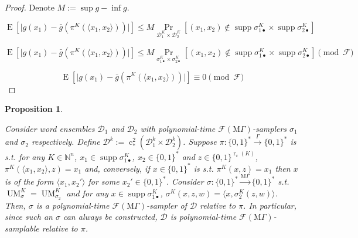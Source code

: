 \documentclass[11pt]{article}
\numberwithin{equation}{section}
\theoremstyle{definition}
\theoremstyle{plain}
\newtheorem{proposition}{Proposition}[section]
\newcommand{\Bool}{\{0,1\}}
\newcommand{\Words}{{\Bool^*}}
\DeclareMathOperator{\Supp}{supp}
\DeclareMathOperator{\Prb}{Pr}
\DeclareMathOperator{\E}{E}
\DeclareMathOperator{\R}{r}
\DeclareMathOperator{\UM}{UM}
\DeclareMathOperator{\En}{c}
\newcommand{\Nats}{\mathbb{N}}
\newcommand{\Abs}[1]{\lvert #1 \rvert}
\newcommand{\Chev}[1]{\langle #1 \rangle}
\newcommand{\Dist}{\mathcal{D}}
\newcommand{\MGrow}{\mathrm{M}\Gamma}
\newcommand{\Fall}{\mathcal{F}}
\newcommand{\EMG}{\Fall(\MGrow)}
\newcommand{\Scheme}{\xrightarrow{\Gamma}}
\newcommand{\MScheme}{\xrightarrow{\MGrow}}
\begin{document}
\begin{proof}

Denote $M:= \sup g - \inf g$.

$$\E[\Abs{g(x_1)-\bar{g}(\pi^{K}(\Chev{x_1,x_2}))}] \leq M \Prb_{ \Dist_1^{K} \times \Dist_2^{K}}[(x_1,x_2) \not\in \Supp \sigma_{1\bullet}^{K} \times \Supp \sigma_{2\bullet}^{K}]$$

$$\E[\Abs{g(x_1)-\bar{g}(\pi^{K}(\Chev{x_1,x_2}))}] \leq M\Prb_{ \sigma_{1\bullet}^{K} \times \sigma_{2\bullet}^{K}}[(x_1,x_2) \not\in \Supp \sigma_{1\bullet}^{K} \times \Supp \sigma_{2\bullet}^{K}] \pmod \Fall$$

$$\E[\Abs{g(x_1)-\bar{g}(\pi^{K}(\Chev{x_1,x_2}))}] \equiv 0 \pmod \Fall$$
\end{proof}
\begin{samepage}
\begin{proposition}
\label{prp:smp_base_change}

Consider word ensembles $\Dist_1$ and $\Dist_2$ with polynomial-time $\EMG$-samplers $\sigma_1$ and $\sigma_2$ respectively. Define ${\Dist^k:=\En_*^2(\Dist_1^k \times \Dist_2^k)}$. Suppose ${\pi: \Words \Scheme \Words}$ is s.t. for any $K \in \Nats^n$, ${x_1 \in \Supp \sigma_{1\bullet}^{K}}$, ${x_2 \in \Words}$ and $z \in \Bool^{\R_\pi(K)}$, ${\pi^{K}(\Chev{x_1,x_2},z)=x_1}$ and, conversely, if ${x \in \Words}$ is s.t. ${\pi^K(x,z)=x_1}$ then ${x}$ is of the form ${\Chev{x_1,x_2'}}$ for some ${x_2' \in \Words}$. Consider ${\sigma: \Words \MScheme \Words}$ s.t. $\UM_\sigma^{K}=\UM_{\sigma_2}^{K}$ and for any $x \in \Supp \sigma_{1\bullet}^{K}$, ${\sigma^{K}(x,z,w)=\Chev{x,\sigma_2^{K}(z,w)}}$. Then, $\sigma$ is a polynomial-time $\EMG$-sampler of $\Dist$ relative to $\pi$. In particular, since such an $\sigma$ can always be constructed, $\Dist$ is polynomial-time $\EMG$-samplable relative to $\pi$.

\end{proposition}
\end{samepage}
\end{document}
